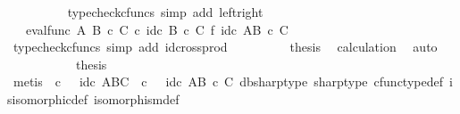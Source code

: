 \begin{isabellebody}
\ \ \ \ \ \ \ \ \isamarkupfalse%
\ {\isacharparenleft}{\kern0pt}typecheck{\isacharunderscore}{\kern0pt}cfuncs{\isacharcomma}{\kern0pt}\ simp\ add{\isacharcolon}{\kern0pt}\ left{\isacharunderscore}{\kern0pt}right{\isacharparenright}{\kern0pt}\isanewline
\ \ \ \ \ \ \isamarkupfalse%
\ \isamarkupfalse%
\ {\isachardoublequoteopen}{\isachardot}{\kern0pt}{\isachardot}{\kern0pt}{\isachardot}{\kern0pt}\ {\isacharequal}{\kern0pt}\ eval{\isacharunderscore}{\kern0pt}func\ A\ {\isacharparenleft}{\kern0pt}B\ {\isasymtimes}\isactrlsub c\ C{\isacharparenright}{\kern0pt}\ {\isasymcirc}\isactrlsub c\ id\isactrlsub c\ {\isacharparenleft}{\kern0pt}B\ {\isasymtimes}\isactrlsub c\ C{\isacharparenright}{\kern0pt}\ {\isasymtimes}\isactrlsub f\ id\isactrlsub c\ {\isacharparenleft}{\kern0pt}A\isactrlbsup {\isacharparenleft}{\kern0pt}B\ {\isasymtimes}\isactrlsub c\ C{\isacharparenright}{\kern0pt}\isactrlesup {\isacharparenright}{\kern0pt}{\isachardoublequoteclose}\isanewline
\ \ \ \ \ \ \ \ \isamarkupfalse%
\ {\isacharparenleft}{\kern0pt}typecheck{\isacharunderscore}{\kern0pt}cfuncs{\isacharcomma}{\kern0pt}\ simp\ add{\isacharcolon}{\kern0pt}\ id{\isacharunderscore}{\kern0pt}cross{\isacharunderscore}{\kern0pt}prod{\isacharparenright}{\kern0pt}\isanewline
\ \ \ \ \ \ \isamarkupfalse%
\ \isamarkupfalse%
\ {\isacharquery}{\kern0pt}thesis\ \isamarkupfalse%
\ calculation\ \isamarkupfalse%
\ auto\isanewline
\ \ \ \ \isamarkupfalse%
\isanewline
\ \ \isamarkupfalse%
\isanewline
\ \ \isamarkupfalse%
\ {\isacharquery}{\kern0pt}thesis\isanewline
\ \ \ \ \isamarkupfalse%
\ {\isacharparenleft}{\kern0pt}metis\ {\isacartoucheopen}{\isasymphi}\isactrlsup {\isasymsharp}\isactrlsup {\isasymsharp}\ {\isasymcirc}\isactrlsub c\ {\isasympsi}\isactrlsup {\isasymsharp}\ {\isacharequal}{\kern0pt}\ id\isactrlsub c\ {\isacharparenleft}{\kern0pt}A\isactrlbsup B\isactrlesup \isactrlbsup C\isactrlesup {\isacharparenright}{\kern0pt}{\isacartoucheclose}\ {\isacartoucheopen}{\isasympsi}\isactrlsup {\isasymsharp}\ {\isasymcirc}\isactrlsub c\ {\isasymphi}\isactrlsup {\isasymsharp}\isactrlsup {\isasymsharp}\ {\isacharequal}{\kern0pt}\ id\isactrlsub c\ {\isacharparenleft}{\kern0pt}A\isactrlbsup {\isacharparenleft}{\kern0pt}B\ {\isasymtimes}\isactrlsub c\ C{\isacharparenright}{\kern0pt}\isactrlesup {\isacharparenright}{\kern0pt}{\isacartoucheclose}\ {\isasymphi}dbsharp{\isacharunderscore}{\kern0pt}type\ {\isasympsi}sharp{\isacharunderscore}{\kern0pt}type\ cfunc{\isacharunderscore}{\kern0pt}type{\isacharunderscore}{\kern0pt}def\ is{\isacharunderscore}{\kern0pt}isomorphic{\isacharunderscore}{\kern0pt}def\ isomorphism{\isacharunderscore}{\kern0pt}def{\isacharparenright}{\kern0pt}\isanewline

\end{isabellebody}
